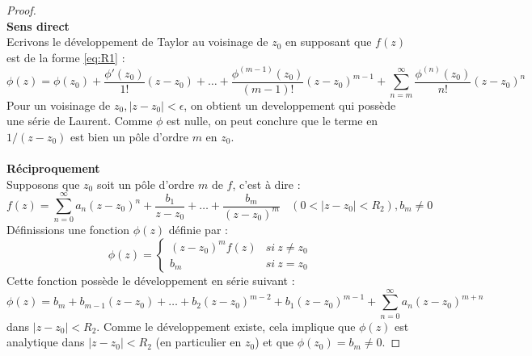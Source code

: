 \begin{proof}\ \\
	\textbf{Sens direct}\\
	Ecrivons le développement de Taylor au voisinage de $z_0$ en supposant que $f(z)$ 
	est de la forme \autoref{eq:R1}  :
	\begin{equation}
		\phi(z) = \phi(z_0)+ \frac{\phi'(z_0)}{1!}(z-z_0) + \dots + \frac{\phi^{(m-1)}(z_0)}{(m-1)!}
		(z-z_0)^{m-1} + \sum_{n=m}^\infty  \frac{\phi^{(n)}(z_0)}{n!}(z-z_0)^n
	\end{equation}
	Pour un voisinage de $z_0, |z-z_0|<\epsilon$, on obtient un developpement qui possède 
	une série de Laurent. Comme $\phi$ est nulle, on peut conclure que le terme en $1/(z-z_0)$
	est bien un pôle d'ordre $m$ en $z_0$.
	\ \\
	\ \\
	\textbf{Réciproquement}\\
	Supposons que $z_0$ soit un pôle d'ordre $m$ de $f$, c'est à dire :
	\begin{equation}
		f(z) = \sum_{n=0}^\infty a_n(z-z_0)^n + \frac{b_1}{z-z_0}+\dots+\frac{b_m}{(z-z_0)^m}\ \
		\ \ (0<|z-z_0|<R_2), b_m\neq0
	\end{equation}
	Définissions une fonction $\phi(z)$ définie par :
	\begin{equation}
		\phi(z) = \left\{\begin{array}{ll}
		(z-z_0)^mf(z) &si\ z\neq z_0\\
		b_m &si\ z=z_0
		\end{array}\right.
	\end{equation}
	Cette fonction possède le développement en série suivant :
	\begin{equation}
		\phi(z) = b_m + b_{m-1}(z-z_0) + \dots +b_2(z-z_0)^{m-2} + b_1(z-z_0)^{m-1} + 
		\sum_{n=0}^\infty a_n(z-z_0)^{m+n}
	\end{equation}
	dans $|z-z_0| < R_2$. Comme le développement existe, cela implique que $\phi(z)$ est 
	analytique dans $|z-z_0|<R_2$ (en particulier en $z_0$) et que $\phi(z_0)=b_m\neq0$.
\end{proof}
	
\ \\	
	
